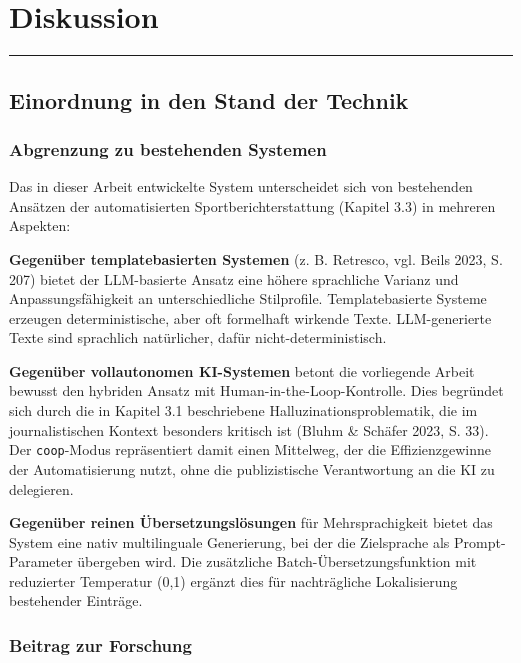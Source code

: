 \chapter{Diskussion}\label{diskussion}

\begin{center}\rule{0.5\linewidth}{0.5pt}\end{center}

\section{Einordnung in den Stand der
Technik}\label{einordnung-in-den-stand-der-technik}

\subsection{Abgrenzung zu bestehenden
Systemen}\label{abgrenzung-zu-bestehenden-systemen}

Das in dieser Arbeit entwickelte System unterscheidet sich von
bestehenden Ansätzen der automatisierten Sportberichterstattung (Kapitel
3.3) in mehreren Aspekten:

\textbf{Gegenüber templatebasierten Systemen} (z. B. Retresco, vgl.
Beils 2023, S. 207) bietet der LLM-basierte Ansatz eine höhere
sprachliche Varianz und Anpassungsfähigkeit an unterschiedliche
Stilprofile. Templatebasierte Systeme erzeugen deterministische, aber
oft formelhaft wirkende Texte. LLM-generierte Texte sind sprachlich
natürlicher, dafür nicht-deterministisch.

\textbf{Gegenüber vollautonomen KI-Systemen} betont die vorliegende
Arbeit bewusst den hybriden Ansatz mit Human-in-the-Loop-Kontrolle. Dies
begründet sich durch die in Kapitel 3.1 beschriebene
Halluzinationsproblematik, die im journalistischen Kontext besonders
kritisch ist (Bluhm \& Schäfer 2023, S. 33). Der \texttt{coop}-Modus
repräsentiert damit einen Mittelweg, der die Effizienzgewinne der
Automatisierung nutzt, ohne die publizistische Verantwortung an die KI
zu delegieren.

\textbf{Gegenüber reinen Übersetzungslösungen} für Mehrsprachigkeit
bietet das System eine nativ multilinguale Generierung, bei der die
Zielsprache als Prompt-Parameter übergeben wird. Die zusätzliche
Batch-Übersetzungsfunktion mit reduzierter Temperatur (0,1) ergänzt dies
für nachträgliche Lokalisierung bestehender Einträge.

\subsection{Beitrag zur Forschung}\label{beitrag-zur-forschung}

